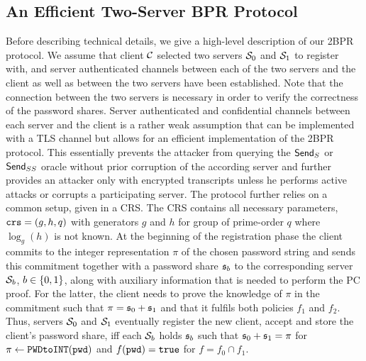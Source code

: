 
\subsection{An Efficient Two-Server BPR Protocol}\label{sec:framework}
Before describing technical details, we give a high-level description of our \ac{2BPR} protocol.
We assume that client $\mathcal{C}$ selected two servers $\mathcal{S}_0$ and $\mathcal{S}_1$ to register with, and server authenticated channels between each of the two servers and the client as well as between the two servers have been established.
Note that the connection between the two servers is necessary in order to verify the correctness of the password shares.
Server authenticated and confidential channels between each server and the client is a rather weak assumption that can be implemented with a \ac{TLS} channel \cite{rfc5246,JagerKSS12,KrawczykPW13} but allows for an efficient implementation of the \ac{2BPR} protocol.
This essentially prevents the attacker from querying the $\mathsf{Send}_S$ or $\mathsf{Send}_{SS}$ oracle without prior corruption of the according server and further provides an attacker only with encrypted transcripts unless he performs active attacks or corrupts a participating server.
The protocol further relies on a common setup, given in a \ac{CRS}.
The \ac{CRS} contains all necessary parameters, \ie $\mathtt{crs}=(g, h, q)$ with generators $g$ and $h$ for group of prime-order $q$ where $\log_g(h)$ is not known.
At the beginning of the registration phase the client commits to the integer representation $\pi$ of the chosen password string \pwd and sends this commitment together with a password share $\mathfrak{s}_b$ to the corresponding server $\mathcal{S}_b$, $b\in\{0,1\}$, along with auxiliary information that is needed to perform the \ac{PC} proof.
For the latter, the client needs to prove the knowledge of $\pi$ in the commitment such that $\pi = \mathfrak{s}_0 + \mathfrak{s}_1$ and that it fulfils both policies $f_1$ and $f_2$.
Thus, servers $\mathcal{S}_0$ and $\mathcal{S}_1$ eventually register the new client, accept and store the client's password share, iff each $\mathcal{S}_b$ holds $\mathfrak{s}_b$ such that $\mathfrak{s}_0+\mathfrak{s}_1=\pi$ for $\pi\gets\texttt{PWDtoINT}(\mathtt{pwd})$ and $f(\mathtt{pwd})=\mathtt{true}$ for $f=f_0\cap f_1$.

